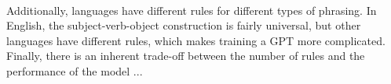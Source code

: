 {{\\[1\baselineskip]
Additionally, languages have different rules for different types of phrasing. In English, the subject-verb-object construction is fairly universal, but other languages have different rules, which makes training a GPT more complicated.
\\[1\baselineskip]
Finally, there is an inherent trade-off between the number of rules and the performance of the model ... 

}}


